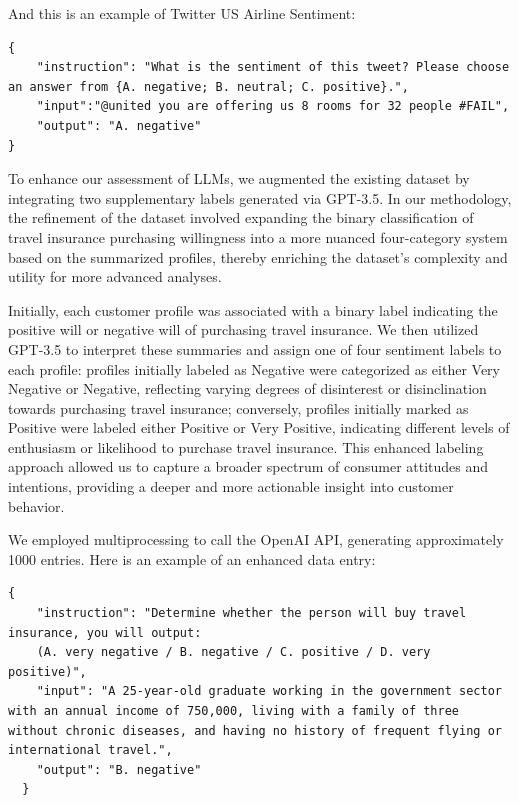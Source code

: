 \documentclass[conference]{IEEEtran}
\begin{document}
And this is an example of Twitter US Airline Sentiment:

\begin{Verbatim}[breaklines=true]
{
    "instruction": "What is the sentiment of this tweet? Please choose an answer from {A. negative; B. neutral; C. positive}.",
    "input":"@united you are offering us 8 rooms for 32 people #FAIL",
    "output": "A. negative"
}
\end{Verbatim}

To enhance our assessment of LLMs, we augmented the existing dataset by integrating two supplementary labels generated via GPT-3.5. In our methodology, the refinement of the dataset involved expanding the binary classification of travel insurance purchasing willingness into a more nuanced four-category system based on the summarized profiles, thereby enriching the dataset's complexity and utility for more advanced analyses. 

Initially, each customer profile was associated with a binary label indicating the positive will or negative will of purchasing travel insurance. We then utilized GPT-3.5 to interpret these summaries and assign one of four sentiment labels to each profile: profiles initially labeled as Negative were categorized as either Very Negative or Negative, reflecting varying degrees of disinterest or disinclination towards purchasing travel insurance; conversely, profiles initially marked as Positive were labeled either Positive or Very Positive, indicating different levels of enthusiasm or likelihood to purchase travel insurance. This enhanced labeling approach allowed us to capture a broader spectrum of consumer attitudes and intentions, providing a deeper and more actionable insight into customer behavior.



We employed multiprocessing to call the OpenAI API, generating approximately 1000 entries. Here is an example of an enhanced data entry:

\begin{Verbatim}[breaklines=true]
  {
    "instruction": "Determine whether the person will buy travel insurance, you will output: 
    (A. very negative / B. negative / C. positive / D. very positive)",
    "input": "A 25-year-old graduate working in the government sector with an annual income of 750,000, living with a family of three without chronic diseases, and having no history of frequent flying or international travel.",
    "output": "B. negative"
  }
\end{Verbatim}
\end{document}
